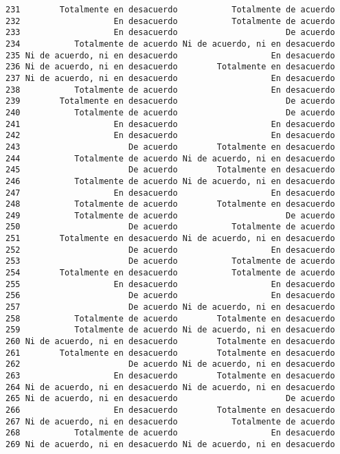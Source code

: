 \documentclass[
  letterpaper,
  DIV=11,
  numbers=noendperiod]{scrartcl}
\begin{document}
\begin{verbatim}
231        Totalmente en desacuerdo           Totalmente de acuerdo
232                   En desacuerdo           Totalmente de acuerdo
233                   En desacuerdo                      De acuerdo
234           Totalmente de acuerdo Ni de acuerdo, ni en desacuerdo
235 Ni de acuerdo, ni en desacuerdo                   En desacuerdo
236 Ni de acuerdo, ni en desacuerdo        Totalmente en desacuerdo
237 Ni de acuerdo, ni en desacuerdo                   En desacuerdo
238           Totalmente de acuerdo                   En desacuerdo
239        Totalmente en desacuerdo                      De acuerdo
240           Totalmente de acuerdo                      De acuerdo
241                   En desacuerdo                   En desacuerdo
242                   En desacuerdo                   En desacuerdo
243                      De acuerdo        Totalmente en desacuerdo
244           Totalmente de acuerdo Ni de acuerdo, ni en desacuerdo
245                      De acuerdo        Totalmente en desacuerdo
246           Totalmente de acuerdo Ni de acuerdo, ni en desacuerdo
247                   En desacuerdo                   En desacuerdo
248           Totalmente de acuerdo        Totalmente en desacuerdo
249           Totalmente de acuerdo                      De acuerdo
250                      De acuerdo           Totalmente de acuerdo
251        Totalmente en desacuerdo Ni de acuerdo, ni en desacuerdo
252                      De acuerdo                   En desacuerdo
253                      De acuerdo           Totalmente de acuerdo
254        Totalmente en desacuerdo           Totalmente de acuerdo
255                   En desacuerdo                   En desacuerdo
256                      De acuerdo                   En desacuerdo
257                      De acuerdo Ni de acuerdo, ni en desacuerdo
258           Totalmente de acuerdo        Totalmente en desacuerdo
259           Totalmente de acuerdo Ni de acuerdo, ni en desacuerdo
260 Ni de acuerdo, ni en desacuerdo        Totalmente en desacuerdo
261        Totalmente en desacuerdo        Totalmente en desacuerdo
262                      De acuerdo Ni de acuerdo, ni en desacuerdo
263                   En desacuerdo        Totalmente en desacuerdo
264 Ni de acuerdo, ni en desacuerdo Ni de acuerdo, ni en desacuerdo
265 Ni de acuerdo, ni en desacuerdo                      De acuerdo
266                   En desacuerdo        Totalmente en desacuerdo
267 Ni de acuerdo, ni en desacuerdo           Totalmente de acuerdo
268           Totalmente de acuerdo                   En desacuerdo
269 Ni de acuerdo, ni en desacuerdo Ni de acuerdo, ni en desacuerdo

\end{verbatim}
\end{document}
